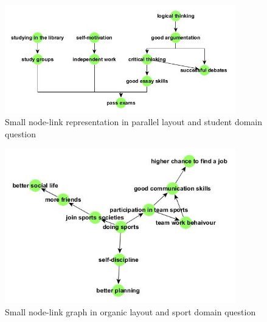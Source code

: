 \documentclass{l4proj}
\begin{document}
\begin{appendices}
\begin{figure}[H]
\centering
\includegraphics[width=10cm]{images/studentSmallParallel.jpg}
\caption{Small node-link representation in parallel layout and student domain question}
\label{studentSmallInDD}
\end{figure}


\begin{figure}[H]
\centering
\includegraphics[width=10cm]{images/sportSmallOrganic.jpg}
\caption{Small node-link graph in organic layout and sport domain question}
\label{sportSmallOrganic}
\end{figure}


\end{appendices}
\end{document}
